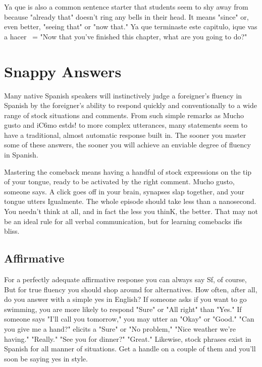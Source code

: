 \documentclass[14pt,a4paper,oneside]{memoir}
\begin{document}
Ya que is also a common sentence starter that students seem
to shy away from because "already that" doesn't ring any bells in their
head. It means "since" or, even better, "seeing that" or "now that." Ya
que terminaste este capitulo, ique vas a hacer~ = "Now that you've
finished this chapter, what are you going to do?"

\chapter{Snappy Answers}

Many native Spanish speakers will instinctively judge a foreigner's fluency in Spanish by the foreigner's ability to respond quickly
and conventionally to a wide range of stock situations and comments.
From such simple remarks as Mucho gusto and iC6mo estds! to more
complex utterances, many statements seem to have a traditional, almost automatic response built in. The sooner you master some of
these answers, the sooner you will achieve an enviable degree of fluency in Spanish.

Mastering the comeback means having a handful of stock expressions on the tip of your tongue, ready to be activated by the right
comment. Mucho gusto, someone says. A click goes off in your brain,
synapses slap together, and your tongue utters Igualmente. The whole
episode should take less than a nanosecond. You needn't think at all,
and in fact the less you thinK, the better. That may not be an ideal rule
for all verbal communication, but for learning comebacks ifis bliss.

\section{Affirmative}

For a perfectly adequate affirmative response you can always
say Sf, of course, But for true fluency you should shop around for alternatives. How often, after all, do you answer with a simple yes in
English? If someone asks if you want to go swimming, you are more
likely to respond "Sure" or "All right" than "Yes." If someone says "I'll
call you tomorrow," you may utter an "Okay" or "Good." "Can you
give me a hand?" elicits a "Sure" or "No problem," "Nice weather
we're having." "Really." "See you for dinner?" "Great." Likewise,
stock phrases exist in Spanish for all manner of situations. Get a
handle on a couple of them and you'll soon be saying yes in style.
\end{document}
